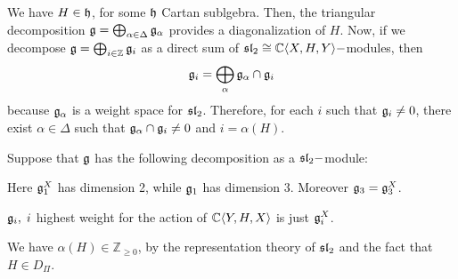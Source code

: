 \begin{itemize}
\begin{remark}
    We have $H\in\mathfrak{h}$, for some $\mathfrak{h}$ Cartan sublgebra. Then, the triangular decomposition 
    $\mathfrak{g}=\bigoplus_{\alpha\in\Delta}\mathfrak{g}_\alpha$ provides a diagonalization of $H$. Now, if we decompose 
    $\mathfrak{g}=\bigoplus_{i\in\mathbb{Z}}\mathfrak{g}_i$ as a direct sum of $\mathfrak{sl}_2\cong\mathbb{C}\langle X,H,Y\rangle-$modules, then 
    \begin{equation}
        \mathfrak{g}_i = \bigoplus_\alpha \mathfrak{g}_\alpha\cap \mathfrak{g}_i
    \end{equation}
    because $\mathfrak{g}_\alpha$ is a weight space for $\mathfrak{sl}_2$. Therefore, for each $i$ such that
    $\mathfrak{g}_i\neq0$, there exist $\alpha\in\Delta$ such that $\mathfrak{g}_\alpha\cap\mathfrak{g}_i\neq0$ and $i=\alpha(H)$. 
\end{remark}


\begin{dang}
    Suppose that $\mathfrak{g}$ has the following decomposition as a $\mathfrak{sl}_2-$module:
    \begin{center}
    \end{center}
    Here $\mathfrak{g}_1^X$ has dimension 2, while $\mathfrak{g}_1$ has dimension 3. Moreover $\mathfrak{g}_3=\mathfrak{g}_3^X$.
\end{dang}

    \begin{dang}
        \begin{remark}
            $\mathfrak{g}_i,\; i$ highest weight for the action of $\mathbb{C}\langle Y,H,X\rangle$ is just $\mathfrak{g}_i^X$.
        \end{remark}
    \end{dang}

\begin{dang}
    \begin{remark}
        We have $\alpha(H)\in\mathbb{Z}_{\geq0}$, by the representation theory of $\mathfrak{sl}_2$ and the fact that 
        $H\in D_\Pi$.
    \end{remark}
\end{dang}
    

\end{itemize}
